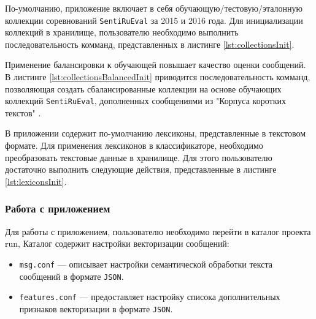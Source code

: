             По-умолчанию, приложение включает в себя обучающую/тестовую/эталонную
            коллекции соревнований {\tt SentiRuEval} за 2015 и 2016 года. Для
            инициализации коллекций в хранилище, пользователю необходимо выполнить
            последовательность комманд, представленных в листинге \ref{lst:collectionsInit}.
            \lstset{style=bash}
            

            Применение балансировки к обучающей повышает качество оценки сообщений.
            \cite{diploma2015} В листинге \ref{lst:collectionsBalancedInit} приводится
            последовательность комманд, позволяющая создать сбалансированные коллекции
            на основе обучающих коллекций {\tt SentiRuEval}, дополненных сообщениями
            из "Корпуса коротких текстов" \cite{rubtsovaCollection}.
            \lstset{style=bash}
            

            В приложении содержит по-умолчанию лексиконы, представленные в текстовом
            формате. Для применения лексиконов в классификаторе, необходимо преобразовать
            текстовые данные в хранилище. Для этого пользователю
            достаточно выполнить следующие действия, представленные в листинге
            \ref{lst:lexiconsInit}.
            \lstset{style=bash}
            

        \subsubsection{Работа с приложением}

            Для работы с приложением, пользователю необходимо перейти в каталог проекта {run},
            Каталог содержит настройки векторизации сообщений:
            \begin{itemize}
                \item {\tt msg.conf} --- описывает настройки семантической обработки текста
                    сообщений в формате {\tt JSON}.
                \item {\tt features.conf} --- предоставляет настройку списока
                    дополнительных признаков векторизации в формате {\tt JSON}.
            \end{itemize}

